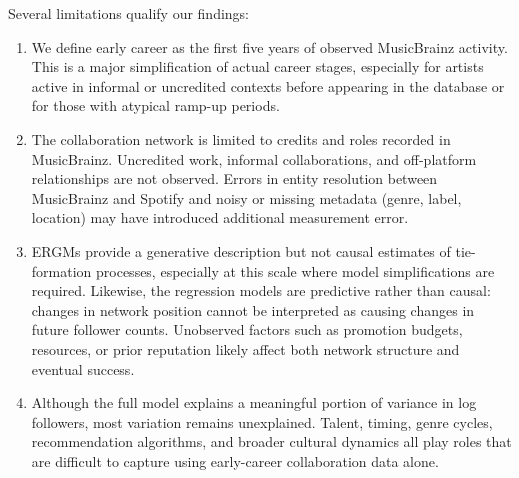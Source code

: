 \documentclass[fleqn,10pt]{wlscirep}
\begin{document}
Several limitations qualify our findings:
\begin{enumerate}
    \item We define early career as the first five years of observed MusicBrainz activity. This is a major simplification of actual career stages, especially for artists active in informal or uncredited contexts before appearing in the database or for those with atypical ramp-up periods.
    \item The collaboration network is limited to credits and roles recorded in MusicBrainz. Uncredited work, informal collaborations, and off-platform relationships are not observed. Errors in entity resolution between MusicBrainz and Spotify and noisy or missing metadata (genre, label, location) may have introduced additional measurement error.
    \item ERGMs provide a generative description but not causal estimates of tie-formation processes, especially at this scale where model simplifications are required. Likewise, the regression models are predictive rather than causal: changes in network position cannot be interpreted as causing changes in future follower counts. Unobserved factors such as promotion budgets, resources, or prior reputation likely affect both network structure and eventual success.
    \item Although the full model explains a meaningful portion of variance in log followers, most variation remains unexplained. Talent, timing, genre cycles, recommendation algorithms, and broader cultural dynamics all play roles that are difficult to capture using early-career collaboration data alone.

\end{enumerate}

\end{document}
